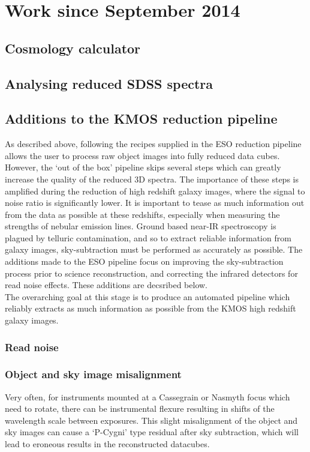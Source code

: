 \documentclass{literature}
\begin{document}
\section{Work since September 2014}\label{sec:work}
\subsection{Cosmology calculator}\label{subsec:cosmo_calc}

\subsection{Analysing reduced SDSS spectra}\label{subsec:sdss_spec}

\subsection{Additions to the KMOS reduction pipeline}\label{subsec:kmos_pipeline}

As described above, following the recipes supplied in the ESO reduction pipeline allows the user to process raw object images into fully reduced data cubes. However, the `out of the box' pipeline skips several steps which can greatly increase the quality of the reduced 3D spectra. The importance of these steps is amplified during the reduction of high redshift galaxy images, where the signal to noise ratio is significantly lower. It is important to tease as much information out from the data as possible at these redshifts, especially when measuring the strengths of nebular emission lines. Ground based near-IR spectroscopy is plagued by telluric contamination, and so to extract reliable information from galaxy images, sky-subtraction must be performed as accurately as possible. The additions made to the ESO pipeline focus on improving the sky-subtraction process prior to science reconstruction, and correcting the infrared detectors for read noise effects. These additions are decsribed below.  \\ 
The overarching goal at this stage is to produce an automated pipeline which reliably extracts as much information as possible from the KMOS high redshift galaxy images. 

\subsubsection{Read noise}


\subsubsection{Object and sky image misalignment}
\citep{Davies2007}
Very often, for instruments mounted at a Cassegrain or Nasmyth focus which need to rotate, there can be instrumental flexure resulting in shifts of the wavelength scale between exposures. This slight misalignment of the object and sky images can cause a `P-Cygni' type residual after sky subtraction, which will lead to eroneous results in the reconstructed datacubes.    
\end{document}
